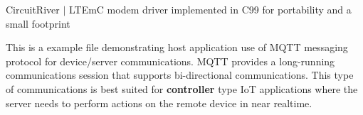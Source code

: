 Circuit\+River $\vert$ LTEmC modem driver implemented in C99 for portability and a small footprint

This is a example file demonstrating host application use of MQTT messaging protocol for device/server communications. MQTT provides a long-\/running communications session that supports bi-\/directional communications. This type of communications is best suited for {\bfseries{controller}} type IoT applications where the server needs to perform actions on the remote device in near realtime. 